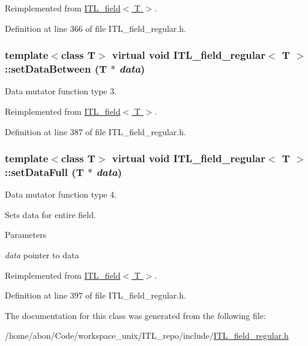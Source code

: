 Reimplemented from \hyperlink{classITL__field_ae87ee8fef9c9b9dc6a782ccbfe3605e1}{ITL\_\-field$<$ T $>$}.



Definition at line 366 of file ITL\_\-field\_\-regular.h.

\hypertarget{classITL__field__regular_a07a0497a570f77755528aa9fc1e50934}{
\subsubsection[{setDataBetween}]{\setlength{\rightskip}{0pt plus 5cm}template$<$class T$>$ virtual void {\bf ITL\_\-field\_\-regular}$<$ T $>$::setDataBetween (T $\ast$ {\em data})}}
\label{classITL__field__regular_a07a0497a570f77755528aa9fc1e50934}


Data mutator function type 3. 



Reimplemented from \hyperlink{classITL__field_a4bbd5103c5298ac87eaac25c759a98c7}{ITL\_\-field$<$ T $>$}.



Definition at line 387 of file ITL\_\-field\_\-regular.h.

\hypertarget{classITL__field__regular_aff339caac0e4e04156553b6b1c194fea}{
\subsubsection[{setDataFull}]{\setlength{\rightskip}{0pt plus 5cm}template$<$class T$>$ virtual void {\bf ITL\_\-field\_\-regular}$<$ T $>$::setDataFull (T $\ast$ {\em data})}}
\label{classITL__field__regular_aff339caac0e4e04156553b6b1c194fea}


Data mutator function type 4. 

Sets data for entire field. 
\begin{DoxyParams}{Parameters}
\item[{\em data}]pointer to data \end{DoxyParams}


Reimplemented from \hyperlink{classITL__field_a0c32994fe56253d8c7111d670742afc1}{ITL\_\-field$<$ T $>$}.



Definition at line 397 of file ITL\_\-field\_\-regular.h.



The documentation for this class was generated from the following file:\begin{DoxyCompactItemize}
\item 
/home/abon/Code/workspace\_\-unix/ITL\_\-repo/include/\hyperlink{ITL__field__regular_8h}{ITL\_\-field\_\-regular.h}\end{DoxyCompactItemize}
